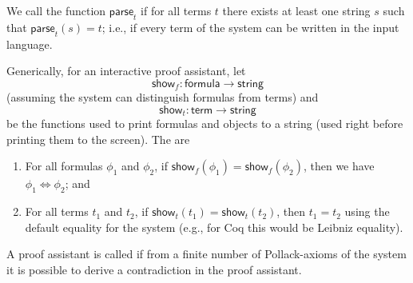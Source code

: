 \begin{node}
\begin{definition}\label{itp-0005}%
We call the function $\mathsf{parse}_{t}$  if for
all terms $t$ there exists at least one string $s$ such that
$\mathsf{parse}_{t}(s)=t$; i.e., if every term of the system can be
written in the input language.
\end{definition}


\begin{definition}\label{itp-0000}%
Generically, for an interactive proof assistant, let
\[\mathsf{show}_{f}\colon\mathsf{formula}\to\mathsf{string}\]
(assuming the system can distinguish formulas from terms) and 
\[\mathsf{show}_{t}\colon\mathsf{term}\to\mathsf{string}\]
be the functions used to print formulas and objects to a string (used right
before printing them to the screen). The  are
\begin{enumerate}
\item For all formulas $\phi_{1}$ and $\phi_{2}$, if
  $\mathsf{show}_{f}(\phi_{1})=\mathsf{show}_{f}(\phi_{2})$, then we
  have $\phi_{1}\iff\phi_{2}$; and
\item For all terms $t_{1}$ and $t_{2}$, if $\mathsf{show}_{t}(t_{1})=\mathsf{show}_{t}(t_{2})$,
  then $t_{1}=t_{2}$ using the default equality for the system (e.g.,
  for Coq this would be Leibniz equality).
\end{enumerate}
\end{definition}

\begin{definition}\label{itp-0006}%
A proof assistant is called  if from a
finite number of Pollack-axioms of the system it is possible to derive a
contradiction in the proof assistant.
\end{definition}
\end{node}
